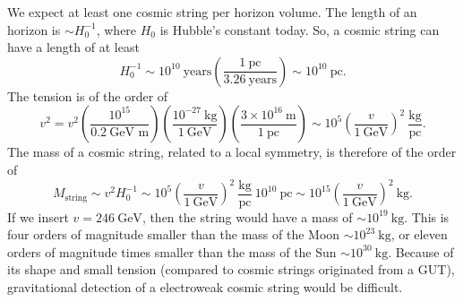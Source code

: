 We expect at least one cosmic string per horizon volume. The length of an horizon is $\sim H^{-1}_0$, where $H_0$ is Hubble's constant today. So, a cosmic string can have a length of at least 
\begin{equation}
H^{-1}_0 \sim   10^{10}\ \text{years} \left(\frac{1\ \text{pc}}{3.26\ \text{years}}\right) \sim 10^{10}\ \text{pc}.
\end{equation}
The tension is of the order of
\begin{equation}
	v^2 = v^2 \left(\frac{10^{15}}{0.2\ \text{GeV m}}\right)\left(\frac{10^{-27}\ \text{kg}}{1\ \text{GeV}}\right)\left(\frac{3\times 10^{16} \ \text{m}}{1\ \text{pc}}\right) \sim 10^5 \left(\frac{v}{1 \ \text{GeV}}\right)^2 \ \frac{\text{kg}}{\text{pc}}.
\end{equation}
The mass of a cosmic string, related to a local symmetry, is therefore of the order of
\begin{equation}
M_{\text{string}} \sim v^2H_0^{-1} \sim 10^5 \left(\frac{v}{1\ \text{GeV}}\right)^2\  \frac{\text{kg}}{\text{pc}}\ 10^{10}\ \text{pc} \sim 10^{15} \left(\frac{v}{1 \ \text{GeV}}\right)^2 \ \text{kg}. 
\end{equation}
If we insert $v = 246 \ \text{GeV}$, then the string would have a mass of $\sim 10^{19}\ \text{kg}$. This is four orders of magnitude smaller than the mass of the Moon $\sim 10^{23} \ \text{kg}$, or eleven orders of magnitude times smaller than the mass of the Sun $\sim 10^{30} \ \text{kg}$. Because of its shape and small tension (compared to cosmic strings originated from a GUT), gravitational detection of a electroweak cosmic string would be difficult.


